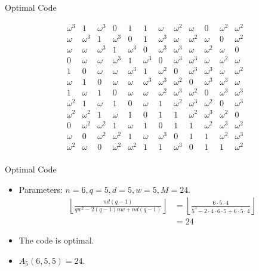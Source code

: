 \documentclass{beamer}
\newcommand{\M}{A}
\begin{document}
 \begin{frame}{Optimal Code}  
  
  \[
   \begin{array}{cccccc|cccccc}
\omega^3&1&\omega^3&0&1&1 & \omega&\omega^2&\omega&0&\omega^2&\omega^2\\
\omega&\omega^3&1&\omega^3&0&1 & \omega^3&\omega&\omega^2&\omega&0&\omega^2\\
\omega&\omega&\omega^3&1&\omega^3&0 & \omega^3&\omega^3&\omega&\omega^2&\omega&0\\
0&\omega&\omega&\omega^3&1&\omega^3 & 0&\omega^3&\omega^3&\omega&\omega^2&\omega\\
1&0&\omega&\omega&\omega^3&1 & \omega^2&0&\omega^3&\omega^3&\omega&\omega^2\\
\omega&1&0&\omega&\omega&\omega^3 & \omega^3&\omega^2&0&\omega^3&\omega^3&\omega\\ \hline
1&\omega&1&0&\omega&\omega & \omega^2&\omega^3&\omega^2&0&\omega^3&\omega^3\\
\omega^2&1&\omega&1&0&\omega & 1&\omega^2&\omega^3&\omega^2&0&\omega^3\\
\omega^2&\omega^2&1&\omega&1&0 & 1&1&\omega^2&\omega^3&\omega^2&0\\
0&\omega^2&\omega^2&1&\omega&1 & 0&1&1&\omega^2&\omega^3&\omega^2\\
\omega&0&\omega^2&\omega^2&1&\omega & \omega^3&0&1&1&\omega^2&\omega^3\\
\omega^2&\omega&0&\omega^2&\omega^2&1 & 1&\omega^3&0&1&1&\omega^2\\
   \end{array}
  \]

 \end{frame}
 
  
 \begin{frame}{Optimal Code}
  
  \begin{itemize}
  \item Parameters: $n=6,q=5,d=5,w=5,M=24$.
  \begin{align*}
  \left\lfloor \frac{nd(q-1)}{qw^2-2(q-1)nw+nd(q-1)} \right\rfloor &= \left\lfloor\frac{6\cdot5\cdot4}{5^3-2\cdot4\cdot6\cdot5+6\cdot5\cdot4}\right\rfloor \\
  &=24
  \end{align*}
   \item The code is optimal.
   \item $\M_5(6,5,5)=24$.
  \end{itemize}
  
 \end{frame}
\end{document}
